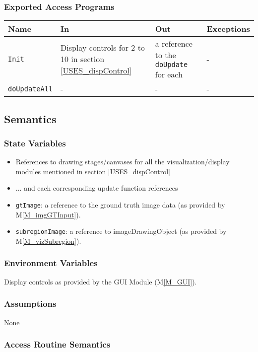 \documentclass[12pt, titlepage]{article}
\newcommand{\mref}[1]{M\ref{#1}}
\newcommand{\mrefp}[1]{(\mref{#1})}
\newcommand{\mreff}[1]{Module \mrefp{#1}}
\newcommand{\code}[1]{\texttt{#1}}
\begin{document}
\subsubsection{Exported Access Programs}

\begin{center}
\begin{tabular}{p{2cm} p{4cm} p{4cm} p{2cm}}
\hline
\textbf{Name} & \textbf{In} & \textbf{Out} & \textbf{Exceptions} \\
\hline
\code{Init} & Display controls for 2 to 10 in section \ref{USES_dispControl}
  & a reference to the \code{doUpdate} for each & - \\
\hline
\code{doUpdateAll} & - & - & - \\
\hline
\end{tabular}
\end{center}

\subsection{Semantics}

\subsubsection{State Variables}
\begin{itemize}
  \item References to drawing stages/canvases for all the visualization/display modules mentioned
    in section \ref{USES_dispControl}
  \item ... and each corresponding update function references
  \item \code{gtImage}: a reference to the ground truth image data (as provided by \mref{M_imgGTInput}).
  \item \code{subregionImage}: a reference to imageDrawingObject (as provided by \mref{M_vizSubregion}).
\end{itemize}

\subsubsection{Environment Variables}
Display controls as provided by the GUI \mreff{M_GUI}.

\subsubsection{Assumptions}
None

\subsubsection{Access Routine Semantics}
\end{document}
